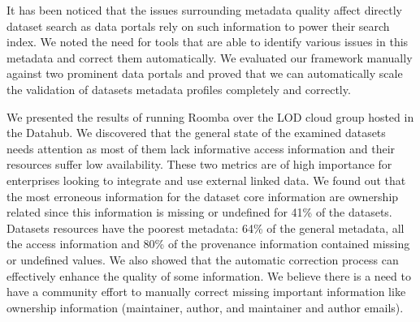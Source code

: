 It has been noticed that the issues surrounding metadata quality affect directly dataset search as data portals rely on such information to power their search index. We noted the need for tools that are able to identify various issues in this metadata and correct them automatically. We evaluated our framework manually against two prominent data portals and proved that we can automatically scale the validation of datasets metadata profiles completely and correctly.

We presented the results of running Roomba over the LOD cloud group hosted in the Datahub. We discovered that the general state of the examined datasets needs attention as most of them lack informative access information and their resources suffer low availability. These two metrics are of high importance for enterprises looking to integrate and use external linked data. We found out that the most erroneous information for the dataset core information are ownership related since this information is missing or undefined for 41\% of the datasets. Datasets resources have the poorest metadata: 64\% of the general metadata, all the access information and 80\% of the provenance information contained missing or undefined values. We also showed that the automatic correction process can effectively enhance the quality of some information. We believe there is a need to have a community effort to manually correct missing important information like ownership information (maintainer, author, and maintainer and author emails).